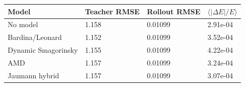 \begin{tabular}{llll}
\toprule
Model & Teacher RMSE & Rollout RMSE & $\langle |\Delta E|/E \rangle$ \\
\midrule
No model & 1.158 & 0.01099 & 2.91e-04 \\
Bardina/Leonard & 1.152 & 0.01099 & 3.52e-04 \\
Dynamic Smagorinsky & 1.155 & 0.01099 & 4.22e-04 \\
AMD & 1.157 & 0.01099 & 3.24e-04 \\
Jaumann hybrid & 1.157 & 0.01099 & 3.07e-04 \\
\bottomrule
\end{tabular}
